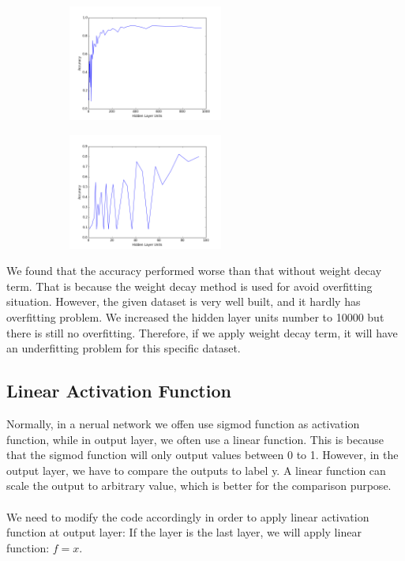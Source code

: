 \documentclass{article}
\begin{document}
 \begin{figure}[H]
 	\centering
 	\begin{subfigure}{.45\textwidth}
 		\centering
 		\includegraphics[width=2in]{figure/figure_3.png}
 	\end{subfigure}
 	\begin{subfigure}{.45\textwidth}
 		\centering
 		\includegraphics[width=2in]{figure/figure_3_2.png}
 	\end{subfigure}
 \end{figure}
We found that the accuracy performed worse than that without weight decay term. That is because the weight decay method is used for avoid overfitting situation. However, the given dataset is very well built, and it hardly has overfitting problem. We increased the hidden layer units number to 10000 but there is still no overfitting. Therefore, if we apply weight decay term, it will have an underfitting problem for this specific dataset.

\subsection{Linear Activation Function}
Normally, in a nerual network we offen use sigmod function as activation function, while in output layer, we often use a linear function. This is because that the sigmod function will only output values between 0 to 1. However, in the output layer, we have to compare the outputs to label y. A linear function can scale the output to arbitrary value, which is better for the comparison purpose. \\
\\
We need to modify the code accordingly in order to apply linear activation function at output layer: If the layer is the last layer, we will apply linear function: $f=x$.
\end{document}
